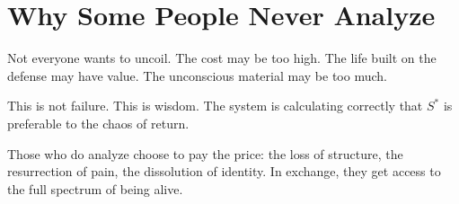 \documentclass[12pt]{article}
\begin{document}
\section{Why Some People Never Analyze}

Not everyone wants to uncoil. The cost may be too high. The life built on the defense may have value. The unconscious material may be too much.

This is not failure. This is wisdom. The system is calculating correctly that $S^*$ is preferable to the chaos of return.

Those who do analyze choose to pay the price: the loss of structure, the resurrection of pain, the dissolution of identity. In exchange, they get access to the full spectrum of being alive.
\end{document}
